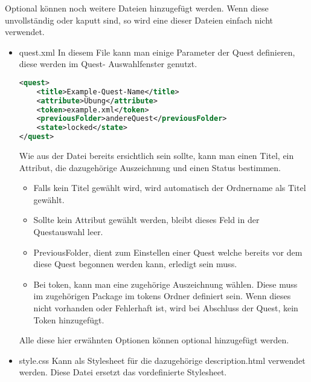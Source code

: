 Optional können noch weitere Dateien hinzugefügt werden. Wenn diese unvollständig oder kaputt sind, so wird eine dieser Dateien einfach nicht verwendet.

\begin{itemize}
\item quest.xml
In diesem File kann man einige Parameter der Quest definieren, diese werden im Quest- Auswahlfenster genutzt.

\begin{lstlisting}[language=XML]
<quest>
    <title>Example-Quest-Name</title>
    <attribute>Übung</attribute>
    <token>example.xml</token>
    <previousFolder>andereQuest</previousFolder>
    <state>locked</state>
</quest>
\end{lstlisting}
Wie aus der Datei bereits ersichtlich sein sollte, kann man einen Titel, ein Attribut, die dazugehörige Auszeichnung und einen Status bestimmen. 
\begin{itemize}
	\item Falls kein Titel gewählt wird, wird automatisch der Ordnername als Titel gewählt. 
\item Sollte kein Attribut gewählt werden, bleibt dieses Feld in der Questauswahl leer.
\item PreviousFolder, dient zum Einstellen einer Quest welche bereits vor dem diese Quest begonnen werden kann, erledigt sein muss.
\item Bei token, kann man eine zugehörige Auszeichnung wählen. Diese muss im zugehörigen Package im tokens Ordner definiert sein. Wenn dieses nicht vorhanden oder Fehlerhaft ist, wird bei Abschluss der Quest, kein Token hinzugefügt.
\end{itemize}
Alle diese hier erwähnten Optionen können optional hinzugefügt werden.
\item style.css
Kann als Stylesheet für die dazugehörige description.html verwendet werden. Diese Datei ersetzt das vordefinierte Stylesheet.

\end{itemize}

